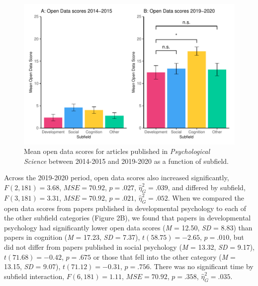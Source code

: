 \documentclass[
  english,
  man,floatsintext]{apa6}
\begin{document}
\begin{figure}
\centering
\includegraphics{icd_special_issue_files/figure-latex/unnamed-chunk-3-1.pdf}
\caption{\label{fig:unnamed-chunk-3}Mean open data scores for articles published in \emph{Psychological Science} between 2014-2015 and 2019-2020 as a function of subfield.}
\end{figure}

Across the 2019-2020 period, open data scores also increased significantly, \(F(2, 181) = 3.68\), \(\mathit{MSE} = 70.92\), \(p = .027\), \(\hat{\eta}^2_G = .039\), and differed by subfield, \(F(3, 181) = 3.31\), \(\mathit{MSE} = 70.92\), \(p = .021\), \(\hat{\eta}^2_G = .052\). When we compared the open data scores from papers published in developmental psychology to each of the other subfield categories (Figure 2B), we found that papers in developmental psychology had significantly lower open data scores (\emph{M} = 12.50, \emph{SD} = 8.83) than papers in cognition (\emph{M} = 17.23, \emph{SD} = 7.37), \(t(58.75) = -2.65\), \(p = .010\), but did not differ from papers published in social psychology (\emph{M} = 13.32, \emph{SD} = 9.17), \(t(71.68) = -0.42\), \(p = .675\) or those that fell into the other category (\emph{M} = 13.15, \emph{SD} = 9.07), \(t(71.12) = -0.31\), \(p = .756\). There was no significant time by subfield interaction, \(F(6, 181) = 1.11\), \(\mathit{MSE} = 70.92\), \(p = .358\), \(\hat{\eta}^2_G = .035\).
\end{document}
